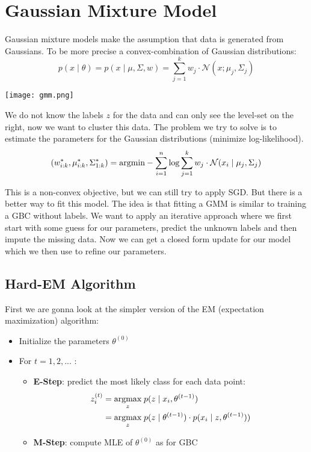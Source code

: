 \section{Gaussian Mixture Model}

Gaussian mixture models make the assumption that data is generated from Gaussians. To be more precise a convex-combination of Gaussian distributions:
$$p(x \; | \; \theta) = p(x \; | \; \mu, \Sigma, w) = \sum_{j=1}^k w_j \cdot \mathcal{N}(x; \mu_j, \Sigma_j)$$

\begin{center}
	\texttt{[image: gmm.png]}
\end{center}

We do not know the labels $z$ for the data and can only see the level-set on the right, now we want to cluster this data. The problem we try to solve is to estimate the parameters for the Gaussian distributions (minimize log-likelihood).
$$(w_{i:k}^*, \mu_{i:k}^*, \Sigma_{1:k}^*) = \underset{\;}{\text{argmin}} - \sum_{i=1}^n \log \sum_{j=1}^k w_j \cdot \mathcal{N}(x_i \; | \; \mu_j, \Sigma_j)$$

This is a non-convex objective, but we can still try to apply SGD. But there is a better way to fit this model. The idea is that fitting a GMM is similar to training a GBC without labels. We want to apply an iterative approach where we first start with some guess for our parameters, predict the unknown labels and then impute the missing data. Now we can get a closed form update for our model which we then use to refine our parameters.

\subsection{Hard-EM Algorithm}

First we are gonna look at the simpler version of the EM (expectation maximization) algorithm:
\begin{itemize}
	\item Initialize the parameters $\theta^{(0)}$
	\item For $t = 1,2,...$ :
		\begin{itemize}
			\item \textbf{E-Step}: predict the most likely class for each data point:
				\begin{align*}
					z_i^{(t)} &= \underset{z}{\text{argmax}} \; p(z \; | \; x_i, \theta^{(t-1)}) \\
					&= \underset{z}{\text{argmax}} \; p(z \; | \; \theta^{(t-1)}) \cdot p(x_i \; | \; z, \theta^{(t-1)}))
				\end{align*}
			\item \textbf{M-Step}: compute MLE of $\theta^{(0)}$ as for GBC
		\end{itemize}
\end{itemize}

